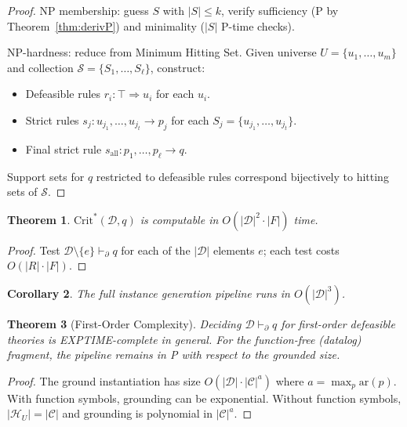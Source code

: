 \documentclass{article}
\newtheorem{theorem}{Theorem}[section]
\newtheorem{corollary}[theorem]{Corollary}
\theoremstyle{definition}
\newcommand{\D}{\mathcal{D}}
\newcommand{\HU}{\mathcal{H}_U}
\newcommand{\CritStar}{\mathrm{Crit}^{*}}
\newcommand{\pPartial}{\vdash_{\partial}}
\newcommand{\defto}{\Rightarrow}
\newcommand{\strictto}{\rightarrow}
\begin{document}
\begin{proof}
NP membership: guess $S$ with $|S| \leq k$, verify sufficiency (P by Theorem~\ref{thm:derivP}) and minimality ($|S|$ P-time checks).

NP-hardness: reduce from Minimum Hitting Set. Given universe $U = \{u_1, \ldots, u_m\}$ and collection $\mathcal{S} = \{S_1, \ldots, S_\ell\}$, construct:
\begin{itemize}[nosep]
    \item Defeasible rules $r_i\colon \top \defto u_i$ for each $u_i$.
    \item Strict rules $s_j\colon u_{j_1}, \ldots, u_{j_t} \strictto p_j$ for each $S_j = \{u_{j_1}, \ldots, u_{j_t}\}$.
    \item Final strict rule $s_{\mathrm{all}}\colon p_1, \ldots, p_\ell \strictto q$.
\end{itemize}
Support sets for $q$ restricted to defeasible rules correspond bijectively to hitting sets of $\mathcal{S}$.
\end{proof}

\begin{theorem}\label{thm:critP}
$\CritStar(\D, q)$ is computable in $O(|\D|^2 \cdot |F|)$ time.
\end{theorem}

\begin{proof}
Test $\D \setminus \{e\} \pPartial q$ for each of the $|\D|$ elements $e$; each test costs $O(|R| \cdot |F|)$.
\end{proof}

\begin{corollary}\label{cor:cubic}
The full instance generation pipeline runs in $O(|\D|^3)$.
\end{corollary}

\begin{theorem}[First-Order Complexity]\label{thm:firstorder}
Deciding $\D \pPartial q$ for first-order defeasible theories is EXPTIME-complete in general. For the function-free (datalog) fragment, the pipeline remains in P with respect to the grounded size.
\end{theorem}

\begin{proof}
The ground instantiation has size $O(|\D| \cdot |\mathcal{C}|^a)$ where $a = \max_p \mathrm{ar}(p)$. With function symbols, grounding can be exponential. Without function symbols, $|\HU| = |\mathcal{C}|$ and grounding is polynomial in $|\mathcal{C}|^a$.
\end{proof}
\end{document}
